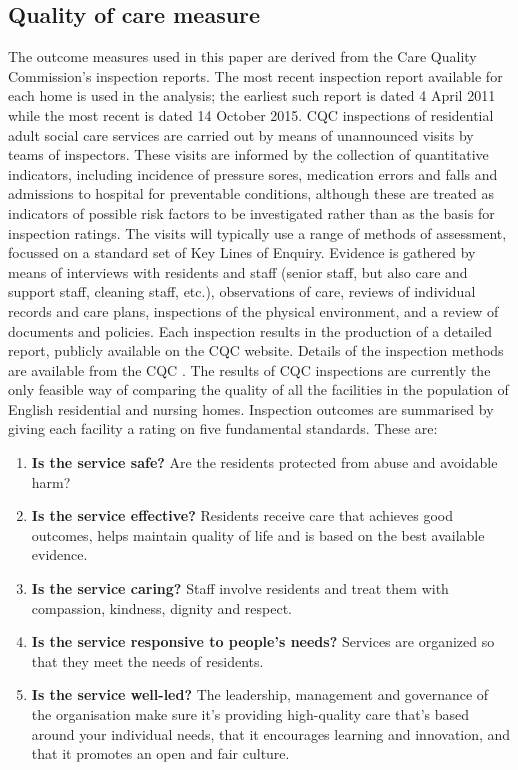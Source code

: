 \documentclass[a4paper,11pt,titlepage,british]{article}
\begin{document}
\subsection{Quality of care measure}

The outcome measures used in this paper are derived from the Care Quality Commission’s inspection reports.  The most recent inspection report available for each home is used in the analysis; the earliest such report is dated 4 April 2011 while the most recent is dated 14 October 2015.  CQC inspections of residential adult social care services are carried out by means of unannounced visits by teams of inspectors.  These visits are informed by the collection of quantitative indicators, including incidence of pressure sores, medication errors and falls and admissions to hospital for preventable conditions, although these are treated as indicators of possible risk factors to be investigated rather than as the basis for inspection ratings.  The visits will typically use a range of methods of assessment, focussed on a standard set of Key Lines of Enquiry.  Evidence is gathered by means of interviews with residents and staff (senior staff, but also care and support staff, cleaning staff, etc.), observations of care, reviews of individual records and care plans, inspections of the physical environment, and a review of documents and policies.  Each inspection results in the production of a detailed report, publicly available on the CQC website.  Details of the inspection methods are available from the CQC \parencite{CQC2016}.  The results of CQC inspections are currently the only feasible way of comparing the quality of all the facilities in the population of English residential and nursing homes.  Inspection outcomes are summarised by giving each facility a rating on five fundamental standards. These are:

\begin{enumerate}
  \item \textbf{Is the service safe?} Are the residents protected from abuse and avoidable harm?
  \item \textbf{Is the service effective?} Residents receive care that achieves good outcomes, helps maintain quality of life and is based on the best available evidence.
  \item \textbf{Is the service caring?} Staff involve residents and treat them with compassion, kindness, dignity and respect.
  \item \textbf{Is the service responsive to people’s needs?} Services are organized so that they meet the needs of residents.
  \item	\textbf{Is the service well-led?} The leadership, management and governance of the organisation make sure it’s providing high-quality care that’s based around your individual needs, that it encourages learning and innovation, and that it promotes an open and fair culture.
\end{enumerate}
	
\end{document}

